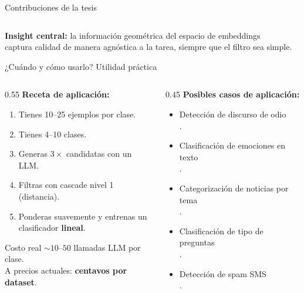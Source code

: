 \begin{frame}{Contribuciones de la tesis}
\begin{columns}[T]
\end{columns}

\vspace{0.5em}
\begin{insight}
\scriptsize\centering
\textbf{Insight central:} la información geométrica del espacio de embeddings\\
captura calidad de manera agnóstica a la tarea, siempre que el filtro sea simple.
\end{insight}
\end{frame}

\begin{frame}{¿Cuándo y cómo usarlo? Utilidad práctica}
\small
\begin{columns}[T]

\begin{column}{0.55\textwidth}
\textbf{Receta de aplicación:}
\begin{enumerate}\setlength\itemsep{1pt}
  \item Tienes \alert{10--25 ejemplos por clase}.
  \item Tienes \alert{4--10 clases}.
  \item Generas $3\times$ candidatas con un LLM.
  \item Filtras con cascade nivel 1 (distancia).
  \item Ponderas suavemente y entrenas un\\
        clasificador \textbf{lineal}.
\end{enumerate}

\vspace{0.4em}
\begin{block}{Costo real}
$\sim 10$--$50$ llamadas LLM por clase.\\
A precios actuales: \textbf{centavos por dataset}.
\end{block}
\end{column}

\begin{column}{0.45\textwidth}
\textbf{Posibles casos de aplicación:}
\scriptsize
\begin{itemize}\setlength\itemsep{1pt}
  \item Detección de discurso de odio\\.
  \item Clasificación de emociones en texto\\.
  \item Categorización de noticias por tema\\.
  \item Clasificación de tipo de preguntas\\.
  \item Detección de spam SMS\\.
\end{itemize}


\end{column}
\end{columns}
\end{frame}
